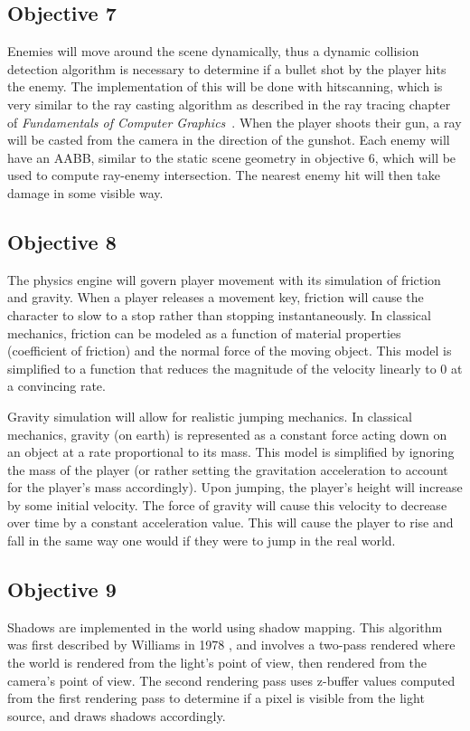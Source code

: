 \documentclass {article}
\begin{document}
\subsection{Objective 7}
Enemies will move around the scene dynamically, thus a dynamic collision detection algorithm is necessary to determine if a bullet shot by the player hits the enemy. The implementation of this will be done with hitscanning, which is very similar to the ray casting algorithm as described in the ray tracing chapter of \textit{Fundamentals of Computer Graphics}~\cite{rtbook}. When the player shoots their gun, a ray will be casted from the camera in the direction of the gunshot. Each enemy will have an AABB, similar to the static scene geometry in objective 6, which will be used to compute ray-enemy intersection. The nearest enemy hit will then take damage in some visible way.


\subsection{Objective 8}
The physics engine will govern player movement with its simulation of friction and gravity. When a player releases a movement key, friction will cause the character to slow to a stop rather than stopping instantaneously. In classical mechanics, friction can be modeled as a function of material properties (coefficient of friction) and the normal force of the moving object. This model is simplified to a function that reduces the magnitude of the velocity linearly to 0 at a convincing rate.

Gravity simulation will allow for realistic jumping mechanics. In classical mechanics, gravity (on earth) is represented as a constant force acting down on an object at a rate proportional to its mass. This model is simplified by ignoring the mass of the player (or rather setting the gravitation acceleration to account for the player's mass accordingly). Upon jumping, the player's height will increase by some initial velocity. The force of gravity will cause this velocity to decrease over time by a constant acceleration value. This will cause the player to rise and fall in the same way one would if they were to jump in the real world.

\subsection{Objective 9}
Shadows are implemented in the world using shadow mapping. This algorithm was first described by Williams in 1978 \cite{shadowmapping}, and involves a two-pass rendered where the world is rendered from the light's point of view, then rendered from the camera's point of view. The second rendering pass uses z-buffer values computed from the first rendering pass to determine if a pixel is visible from the light source, and draws shadows accordingly.
\end{document}
